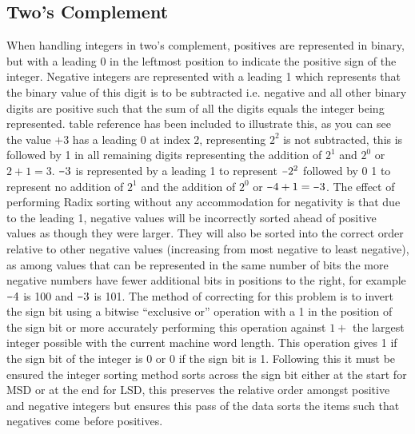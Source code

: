 \documentclass[12pt]{article}
\newcommand{\minus}{\scalebox{0.75}[1.0]{$-$}}
\begin{document}
	\subsection{Two's Complement}
	When handling integers in two’s complement, positives are represented in binary, but with a leading 0 in the leftmost position to indicate the positive sign of the integer. Negative integers are represented with a leading 1 which represents that the binary value of this digit is to be subtracted i.e. negative and all other binary digits are positive such that the sum of all the digits equals the integer being represented. table reference has been included to illustrate this, as you can see the value $+3$ has a leading $0$ at index $2$, representing $2^{2}$ is not subtracted, this is followed by 1 in all remaining digits representing the addition of $2^{1}$ and $2^{0}$ or $2+1=3$. $\minus3$ is represented by a leading 1 to represent $\minus2^{2}$ followed by 0 1 to represent no addition of $2^{1}$ and the addition of $2^{0}$ or $\minus4 + 1 = \minus3$.
	\newline
	The effect of performing Radix sorting without any accommodation for negativity is that due to the leading 1, negative values will be incorrectly sorted ahead of positive values as though they were larger. They will also be sorted into the correct order relative to other negative values (increasing from most negative to least negative), as among values that can be represented in the same number of bits the more negative numbers have fewer additional bits in positions to the right, for example $\minus4$ is 100 and $\minus 3$ is 101.
	\newline
	The method of correcting for this problem is to invert the sign bit using a bitwise “exclusive or” operation with a 1 in the position of the sign bit or more accurately performing this operation against $1 +$ the largest integer possible with the current machine word length. This operation gives 1 if the sign bit of the integer is 0 or 0 if the sign bit is 1. Following this it must be ensured the integer sorting method sorts across the sign bit either at the start for MSD or at the end for LSD, this preserves the relative order amongst positive and negative integers but ensures this pass of the data sorts the items such that negatives come before positives.
\end{document}
